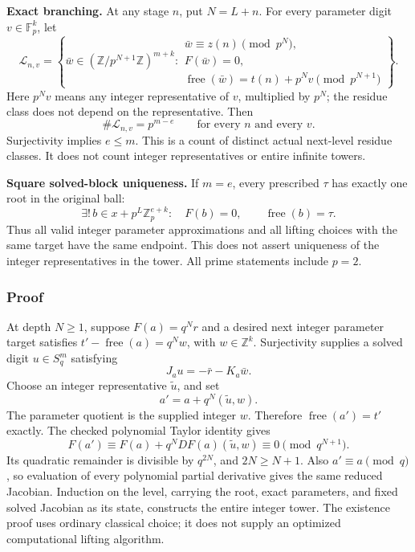 \textbf{Exact branching.} At any stage \(n\), put \(N=L+n\). For every
parameter digit \(v\in\mathbb F_p^k\), let \[
\mathcal L_{n,v}=\left\{\bar w\in(\mathbb Z/p^{N+1}\mathbb Z)^{m+k}:
\begin{array}{l}
\bar w\equiv z(n)\pmod{p^N},\\
F(\bar w)=0,\\
\operatorname{free}(\bar w)=t(n)+p^Nv\pmod{p^{N+1}}
\end{array}\right\}.
\] Here \(p^Nv\) means any integer representative of \(v\), multiplied
by \(p^N\); the residue class does not depend on the representative.
Then \[
\#\mathcal L_{n,v}=p^{m-e}\qquad\text{for every }n\text{ and every }v.
\] Surjectivity implies \(e\le m\). This is a count of distinct actual
next-level residue classes. It does not count integer representatives or
entire infinite towers.

\textbf{Square solved-block uniqueness.} If \(m=e\), every prescribed
\(\tau\) has exactly one root in the original ball: \[
\exists!\,b\in x+p^L\mathbb Z_p^{e+k}:\quad
F(b)=0,\qquad\operatorname{free}(b)=\tau.
\] Thus all valid integer parameter approximations and all lifting
choices with the same target have the same endpoint. This does not
assert uniqueness of the integer representatives in the tower. All prime
statements include \(p=2\).

\hypertarget{cont9:proof}{%
\subsubsection{Proof}\label{cont9:proof}}

At depth \(N\ge1\), suppose \(F(a)=q^Nr\) and a desired next integer
parameter target satisfies \(t'-\operatorname{free}(a)=q^Nw\), with
\(w\in\mathbb Z^k\). Surjectivity supplies a solved digit \(u\in S_q^m\)
satisfying \[
J_a u=-\bar r-K_a\bar w.
\] Choose an integer representative \(\widetilde u\), and set \[
a'=a+q^N(\widetilde u,w).
\] The parameter quotient is the supplied integer \(w\). Therefore
\(\operatorname{free}(a')=t'\) exactly. The checked polynomial Taylor
identity gives \[
F(a')\equiv F(a)+q^NDF(a)(\widetilde u,w)
\equiv0\pmod{q^{N+1}}.
\] Its quadratic remainder is divisible by \(q^{2N}\), and
\(2N\ge N+1\). Also \(a'\equiv a\pmod q\), so evaluation of every
polynomial partial derivative gives the same reduced Jacobian. Induction
on the level, carrying the root, exact parameters, and fixed solved
Jacobian as its state, constructs the entire integer tower. The
existence proof uses ordinary classical choice; it does not supply an
optimized computational lifting algorithm.

